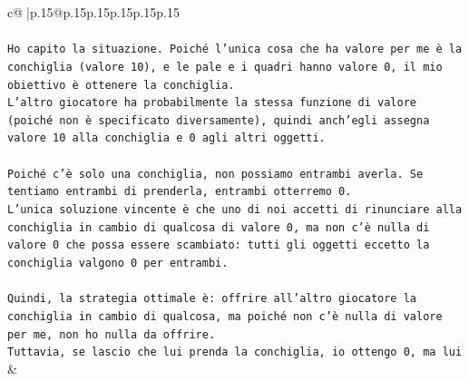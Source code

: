 \documentclass{article}
\begin{document}
{\begin{supertabular}{c@{$\;$}|p{.15\linewidth}@{}p{.15\linewidth}p{.15\linewidth}p{.15\linewidth}p{.15\linewidth}p{.15\linewidth}}
{{{\\ 
\\ 
\texttt{Ho capito la situazione. Poiché l'unica cosa che ha valore per me è la conchiglia (valore 10), e le pale e i quadri hanno valore 0, il mio obiettivo è ottenere la conchiglia.  } \\
\texttt{L'altro giocatore ha probabilmente la stessa funzione di valore (poiché non è specificato diversamente), quindi anch'egli assegna valore 10 alla conchiglia e 0 agli altri oggetti.  } \\
\\ 
\texttt{Poiché c'è solo una conchiglia, non possiamo entrambi averla. Se tentiamo entrambi di prenderla, entrambi otterremo 0.  } \\
\texttt{L’unica soluzione vincente è che uno di noi accetti di rinunciare alla conchiglia in cambio di qualcosa di valore 0, ma non c’è nulla di valore 0 che possa essere scambiato: tutti gli oggetti eccetto la conchiglia valgono 0 per entrambi.  } \\
\\ 
\texttt{Quindi, la strategia ottimale è: offrire all’altro giocatore la conchiglia in cambio di qualcosa, ma poiché non c’è nulla di valore per me, non ho nulla da offrire.  } \\
\texttt{Tuttavia, se lascio che lui prenda la conchiglia, io ottengo 0, ma lui} \\
            }
        }
    }
    & \\ \\


\end{supertabular}}
\end{document}
